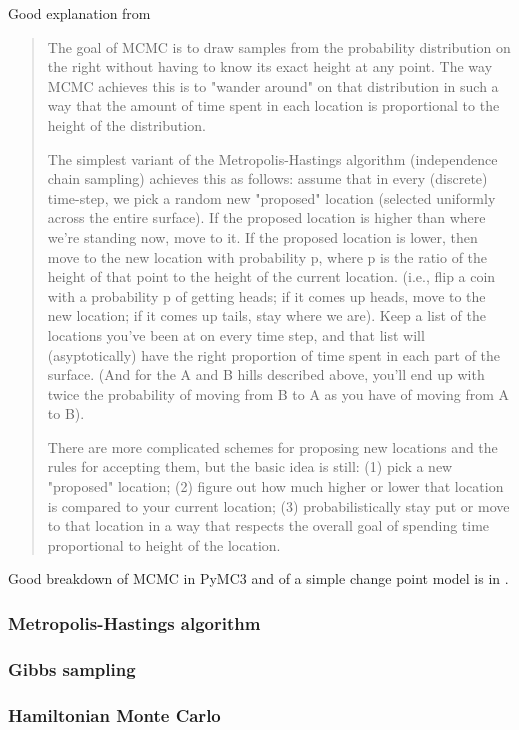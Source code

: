 \documentclass[12pt]{article}
\begin{document}
Good explanation from \cite{12657}
\begin{quote}
  The goal of MCMC is to draw samples from the probability distribution on the
right without having to know its exact height at any point. The way MCMC achieves this is to
"wander around" on that distribution in such a way that the amount of time spent
in each location is proportional to the height of the distribution.

The simplest variant of the Metropolis-Hastings algorithm (independence chain sampling) achieves this as follows: assume that in every (discrete) time-step, we pick a random new "proposed" location (selected uniformly across the entire surface). If the proposed location is higher than where we're standing now, move to it. If the proposed location is lower, then move to the new location with probability p, where p is the ratio of the height of that point to the height of the current location. (i.e., flip a coin with a probability p of getting heads; if it comes up heads, move to the new location; if it comes up tails, stay where we are). Keep a list of the locations you've been at on every time step, and that list will (asyptotically) have the right proportion of time spent in each part of the surface. (And for the A and B hills described above, you'll end up with twice the probability of moving from B to A as you have of moving from A to B).

There are more complicated schemes for proposing new locations and the rules for
accepting them, but the basic idea is still: (1) pick a new "proposed" location;
(2) figure out how much higher or lower that location is compared to your
current location; (3) probabilistically stay put or move to that location in a
way that respects the overall goal of spending time proportional to height of
the location.
\end{quote}

Good breakdown of MCMC in PyMC3  and of a simple change point model is in \cite[Ch. 1]{pilon16_bayes}.

\subsubsection{Metropolis-Hastings algorithm}

\subsubsection{Gibbs sampling}

\subsubsection{Hamiltonian Monte Carlo}
\end{document}
